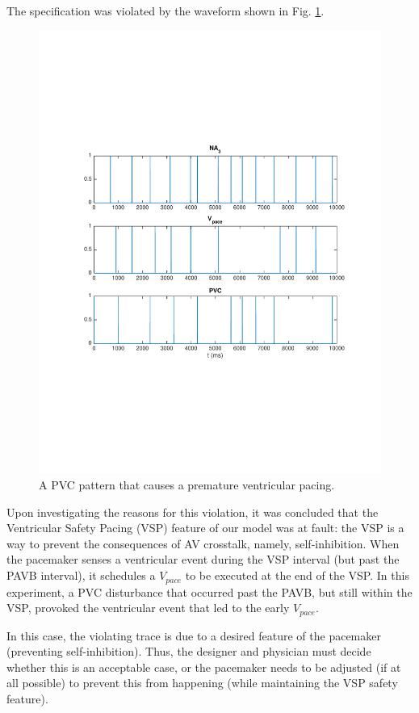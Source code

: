 The specification was violated by the waveform shown in Fig. \ref{fig:bug8_kept1}.
\begin{figure}[tb]
\centering
\includegraphics[width=0.7\linewidth]{figures/bug8_kept1}
\caption{A PVC pattern that causes a premature ventricular pacing.}
\label{fig:bug8_kept1}
\end{figure}
Upon investigating the reasons for this violation, it was concluded that the Ventricular Safety Pacing (VSP) feature of our model was at fault: the VSP is a way to prevent the consequences of AV crosstalk, namely, self-inhibition. 
When the pacemaker senses a ventricular event during the VSP interval (but past the PAVB interval), it schedules a $V_{pace}$ to be executed at the end of the VSP.
In this experiment, a PVC disturbance that occurred past the PAVB, but still within the VSP, provoked the ventricular event that led to the early $V_{pace}$.

In this case, the violating trace is due to a desired feature of the pacemaker (preventing self-inhibition).
Thus, the designer and physician must decide whether this is an acceptable case, or the pacemaker needs to be adjusted (if at all possible) to prevent this from happening (while maintaining the VSP safety feature).

